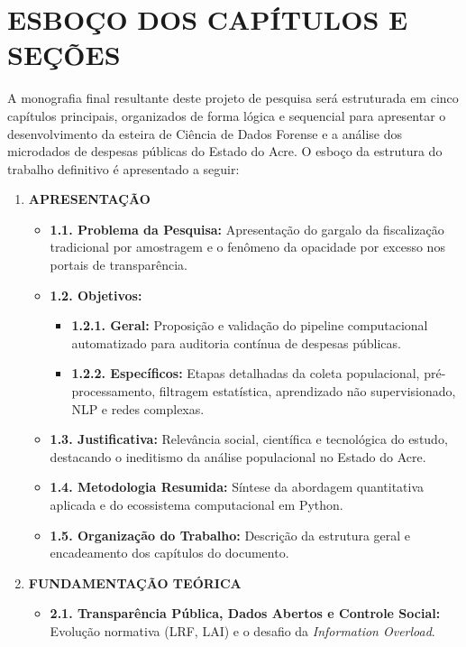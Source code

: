 \documentclass[
    12pt,               %
    openright,          %
    oneside,            %
    a4paper,            %
    chapter=TITLE,      %
    sumario=tradicional,%
    english,            %
    brazilian,          %
 ]{abntex2}
\begin{document}
\chapter{ESBOÇO DOS CAPÍTULOS E SEÇÕES}\label{sec:esboco_capitulos}
A monografia final resultante deste projeto de pesquisa será estruturada em cinco capítulos principais, organizados de forma lógica e sequencial para apresentar o desenvolvimento da esteira de Ciência de Dados Forense e a análise dos microdados de despesas públicas do Estado do Acre. O esboço da estrutura do trabalho definitivo é apresentado a seguir:

\begin{enumerate}
    \item \textbf{APRESENTAÇÃO}
    \begin{itemize}
        \item \textbf{1.1. Problema da Pesquisa:} Apresentação do gargalo da fiscalização tradicional por amostragem e o fenômeno da opacidade por excesso nos portais de transparência.
        \item \textbf{1.2. Objetivos:}
        \begin{itemize}
            \item \textbf{1.2.1. Geral:} Proposição e validação do pipeline computacional automatizado para auditoria contínua de despesas públicas.
            \item \textbf{1.2.2. Específicos:} Etapas detalhadas da coleta populacional, pré-processamento, filtragem estatística, aprendizado não supervisionado, NLP e redes complexas.
        \end{itemize}
        \item \textbf{1.3. Justificativa:} Relevância social, científica e tecnológica do estudo, destacando o ineditismo da análise populacional no Estado do Acre.
        \item \textbf{1.4. Metodologia Resumida:} Síntese da abordagem quantitativa aplicada e do ecossistema computacional em Python.
        \item \textbf{1.5. Organização do Trabalho:} Descrição da estrutura geral e encadeamento dos capítulos do documento.
    \end{itemize}
    \item \textbf{FUNDAMENTAÇÃO TEÓRICA}
    \begin{itemize}
        \item \textbf{2.1. Transparência Pública, Dados Abertos e Controle Social:} Evolução normativa (LRF, LAI) e o desafio da \textit{Information Overload}.

\end{itemize}
\end{enumerate}
\end{document}
